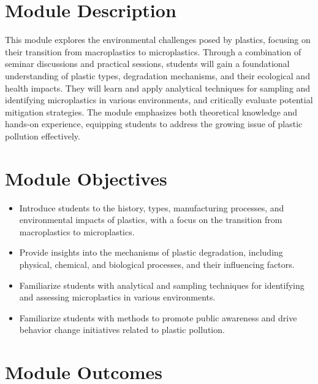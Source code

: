 \documentclass[
  letterpaper,
  10pt,
  openany]{book}
\providecommand{\tightlist}{%
  \setlength{\itemsep}{0pt}\setlength{\parskip}{0pt}}\usepackage{longtable,booktabs,array}
\begin{document}
\section*{Module Description}\label{module-description-5}


This module explores the environmental challenges posed by plastics,
focusing on their transition from macroplastics to microplastics.
Through a combination of seminar discussions and practical sessions,
students will gain a foundational understanding of plastic types,
degradation mechanisms, and their ecological and health impacts. They
will learn and apply analytical techniques for sampling and identifying
microplastics in various environments, and critically evaluate potential
mitigation strategies. The module emphasizes both theoretical knowledge
and hands-on experience, equipping students to address the growing issue
of plastic pollution effectively.

\section*{Module Objectives}\label{module-objectives-4}


\begin{itemize}
\tightlist
\item
  Introduce students to the history, types, manufacturing processes, and
  environmental impacts of plastics, with a focus on the transition from
  macroplastics to microplastics.
\item
  Provide insights into the mechanisms of plastic degradation, including
  physical, chemical, and biological processes, and their influencing
  factors.
\item
  Familiarize students with analytical and sampling techniques for
  identifying and assessing microplastics in various environments.
\item
  Familiarize students with methods to promote public awareness and
  drive behavior change initiatives related to plastic pollution.
\end{itemize}

\section*{Module Outcomes}\label{module-outcomes-4}
\end{document}
